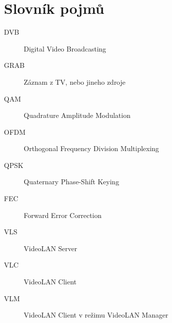 
\chapter{Slovník pojmů}
\begin{description}
\item[DVB] Digital Video Broadcasting
\item[GRAB] Záznam z TV, nebo jineho zdroje
\item[QAM] Quadrature Amplitude Modulation
\item[OFDM] Orthogonal Frequency Division Multiplexing
\item[QPSK] Quaternary Phase-Shift Keying 
\item[FEC] Forward Error Correction 
\item[VLS] VideoLAN Server 
\item[VLC] VideoLAN Client 
\item[VLM] VideoLAN Client v režimu VideoLAN Manager 

\end{description}

